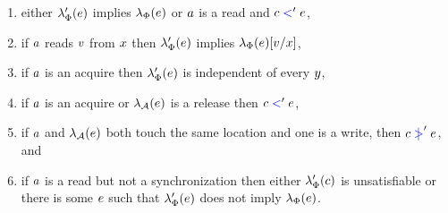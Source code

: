 \begin{definition}
\begin{enumerate}
\item either $\lambda_{\Phi}'(e)$ implies $\lambda_{\Phi}(e)$ or
  $a$ is a read and $c\mathrel{{\color{blue}<}}'e$,
\item if $a$ reads $v$ from $x$ then
   $\lambda_{\Phi}'(e)$ implies $\lambda_{\Phi}(e)[v/x]$, %
\item if $a$ is an acquire then $\lambda_{\Phi}'(e)$ is independent of every $y$,
\item if $a$ is an acquire or $\lambda_{\mathcal{A}}(e)$ is a release then $c \mathrel{{\color{blue}<}}' e$, 
\item if $a$ and $\lambda_{\mathcal{A}}(e)$ both touch the same location and one is a write,
    then $c \mathrel{{\color{blue}\mkern4mu\mid\!\!\!>}}' e$, and
\item if $a$ is a read but not a synchronization then either
  $\lambda_{\Phi}'(c)$ is unsatisfiable or there is some $e$ such
  that $\lambda_{\Phi}'(e)$ does not imply $\lambda_{\Phi}(e)$.

\end{enumerate}
\end{definition}
